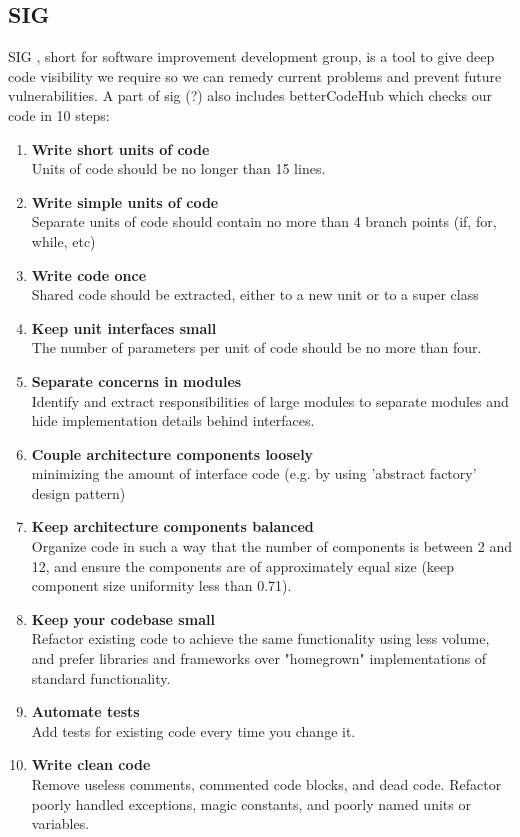 \subsection{SIG}
SIG \cite{sig}, short for software improvement development group, is a tool to give deep code visibility we require so we can remedy current problems and prevent future vulnerabilities. A part of sig \todo{}(?) also includes betterCodeHub \cite{better_code_hub} which checks our code in 10 steps:
\begin{enumerate}
    \item \textbf {Write short units of code} \\
    Units of code should be no longer than 15 lines.
    \item \textbf {Write simple units of code} \\
    Separate units of code should contain no more than 4 branch points (if, for, while, etc)
    \item \textbf{Write code once} \\
    Shared code should be extracted, either to a new unit or to a super class
    \item \textbf{Keep unit interfaces small} \\
    The number of parameters per unit of code should be no more than four.
    \item \textbf{Separate concerns in modules} \\
    Identify and extract responsibilities of large modules to separate modules and hide implementation details behind interfaces.
    \item \textbf{Couple architecture components loosely} \\
    minimizing the amount of interface code (e.g. by using 'abstract factory' design pattern)
    \item \textbf{Keep architecture components balanced} \\
    Organize code in such a way that the number of components is between 2 and 12, and ensure the components are of approximately equal size (keep component size uniformity less than 0.71).
    \item \textbf{Keep your codebase small} \\
    Refactor existing code to achieve the same functionality using less volume, and prefer libraries and frameworks over "homegrown" implementations of standard functionality.
    \item \textbf{Automate tests} \\
    Add tests for existing code every time you change it.
    \item \textbf{Write clean code}\\
    Remove useless comments, commented code blocks, and dead code. Refactor poorly handled exceptions, magic constants, and poorly named units or variables.  
\end{enumerate}

\begin{comment}
- double city names
- city names with meaning (leiden)
- city/province names (utrecht / groningen / zeeland)
\end{comment}